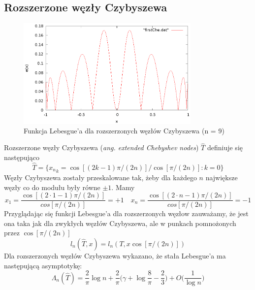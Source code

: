 \documentclass{article}
\begin{document}
\subsection{Rozszerzone węzły Czybyszewa}
\begin{figure}[H]
	\centering
    \includegraphics[width=0.8\textwidth]{wykresy/firstChe.eps}
    \caption{Funkcja Lebesgue'a dla rozszerzonych węzłów Czybyszewa (n = 9)}
\end{figure}
Rozszerzone węzły Czybyszewa (\emph{ang. extended Chebyshev nodes}) $\hat{T}$ definiuje się następująco
\begin{equation*}
\hat{T} = \{{x_n}_k = \cos[(2k - 1)\pi/(2n)] / \cos[\pi/(2n)] : k = 0\}
\end{equation*}
Węzły Czybyszewa zostały przeskalowane tak, żeby dla każdego $n$ największe węzły co do modułu były równe $\pm 1$. Mamy
\begin{equation*}
x_1 = \frac{\cos[(2 \cdot 1 - 1) \pi/(2n)]}{cos[\pi/(2n)]} = +1 \quad x_n = \frac{\cos[(2 \cdot n - 1) \pi/(2n)]}{cos[\pi/(2n)]} = -1
\end{equation*}
Przyglądając się funkcji Lebesgue'a dla rozszerzonych węzłow zauważamy, że jest ona taka jak dla zwykłych węzłów Czybyszewa, ale w punkach pomnożonych przez $\cos[\pi/(2n)]$
\begin{equation*}
l_n(\hat{T}, x) = l_n(T, x \cos[\pi/(2n)])
\end{equation*}
Dla rozszerzonych węzłów Czybyszewa wykazano, że stała Lebesgue'a ma następującą asymptotykę:
\begin{equation*}
\Lambda_n(\hat{T}) = \frac{2}{\pi} \log n + \frac{2}{\pi}\Big(\gamma + \log \frac{8}{\pi} - \frac{2}{3}\Big) + O \Big(\frac{1}{\log n}\Big)
\end{equation*}
\end{document}

